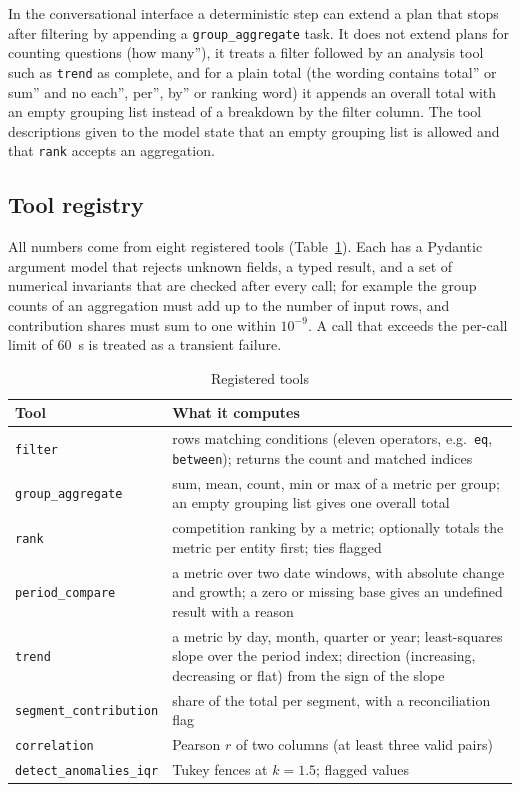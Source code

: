 In the conversational interface a deterministic step can extend a plan that stops after filtering by appending a \texttt{group\_aggregate} task. It does not extend plans for counting questions (how many''), it treats a filter followed by an analysis tool such as \texttt{trend} as complete, and for a plain total (the wording contains total'' or sum'' and no each'', per'', by'' or ranking word) it appends an overall total with an empty grouping list instead of a breakdown by the filter column. The tool descriptions given to the model state that an empty grouping list is allowed and that \texttt{rank} accepts an aggregation.

\subsection{Tool registry}
All numbers come from eight registered tools (Table~\ref{tab:tools}). Each has a Pydantic argument model that rejects unknown fields, a typed result, and a set of numerical invariants that are checked after every call; for example the group counts of an aggregation must add up to the number of input rows, and contribution shares must sum to one within $10^{-9}$. A call that exceeds the per-call limit of 60~s is treated as a transient failure.

\begin{table}[t]
\caption{Registered tools}
\label{tab:tools}
\centering
\footnotesize
\begin{tabular}{p{2.9cm}p{4.9cm}}
\hline
Tool & What it computes \\
\hline
\texttt{filter} & rows matching conditions (eleven operators, e.g.\ \texttt{eq}, \texttt{between}); returns the count and matched indices \\
\texttt{group\_\allowbreak aggregate} & sum, mean, count, min or max of a metric per group; an empty grouping list gives one overall total \\
\texttt{rank} & competition ranking by a metric; optionally totals the metric per entity first; ties flagged \\
\texttt{period\_\allowbreak compare} & a metric over two date windows, with absolute change and growth; a zero or missing base gives an undefined result with a reason \\
\texttt{trend} & a metric by day, month, quarter or year; least-squares slope over the period index; direction (increasing, decreasing or flat) from the sign of the slope \\
\texttt{segment\_\allowbreak contribution} & share of the total per segment, with a reconciliation flag \\
\texttt{correlation} & Pearson $r$ of two columns (at least three valid pairs) \\
\texttt{detect\_\allowbreak anomalies\_\allowbreak iqr} & Tukey fences at $k=1.5$; flagged values \\
\hline
\end{tabular}
\end{table}

